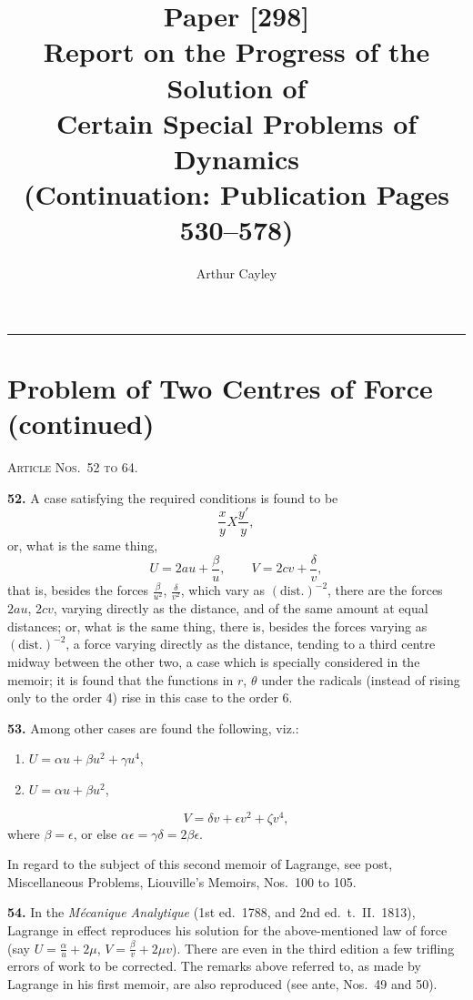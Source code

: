 \documentclass[11pt,a4paper]{article}
\title{\textbf{Paper [298]}\\[6pt]
\Large Report on the Progress of the Solution of\\
Certain Special Problems of Dynamics\\[12pt]
\large (Continuation: Publication Pages 530--578)}
\author{Arthur Cayley}
\date{}
\theoremstyle{definition}
\begin{document}
\maketitle
\thispagestyle{fancy}

\noindent\rule{\textwidth}{0.5pt}

\section*{Problem of Two Centres of Force (continued)}

\noindent\textsc{Article Nos.~52 to 64.}

\medskip

\textbf{52.} A case satisfying the required conditions is found to be
\[
\frac{x}{y} X \frac{y'}{y},
\]
or, what is the same thing,
\[
U = 2au + \frac{\beta}{u}, \qquad V = 2cv + \frac{\delta}{v},
\]
that is, besides the forces $\frac{\beta}{u^2}$, $\frac{\delta}{v^2}$, which vary as $(\text{dist.})^{-2}$, there are the forces $2au$, $2cv$, varying directly as the distance, and of the same amount at equal distances; or, what is the same thing, there is, besides the forces varying as $(\text{dist.})^{-2}$, a force varying directly as the distance, tending to a third centre midway between the other two, a case which is specially considered in the memoir; it is found that the functions in $r$, $\theta$ under the radicals (instead of rising only to the order 4) rise in this case to the order 6.

\textbf{53.} Among other cases are found the following, viz.:
\begin{enumerate}[label=\arabic*.]
    \item $U = \alpha u + \beta u^2 + \gamma u^4$,
    \item $U = \alpha u + \beta u^2$,
\end{enumerate}
\[
V = \delta v + \epsilon v^2 + \zeta v^4,
\]
where $\beta = \epsilon$, or else $\alpha\epsilon = \gamma\delta = 2\beta\epsilon$.

In regard to the subject of this second memoir of Lagrange, see post, Miscellaneous Problems, Liouville's Memoirs, Nos.~100 to 105.

\textbf{54.} In the \textit{M\'ecanique Analytique} (1st ed.~1788, and 2nd ed.~t.~II.~1813), Lagrange in effect reproduces his solution for the above-mentioned law of force (say $U = \frac{\alpha}{u} + 2\mu$, $V = \frac{\beta}{v} + 2\mu v$). There are even in the third edition a few trifling errors of work to be corrected. The remarks above referred to, as made by Lagrange in his first memoir, are also reproduced (see ante, Nos.~49 and 50).
\end{document}
